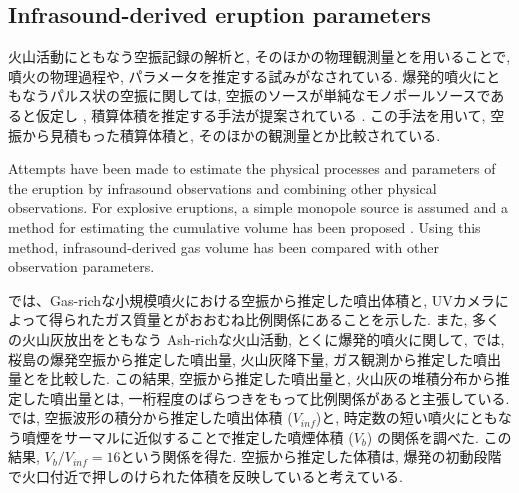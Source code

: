 \documentclass[12pt]{article}
\begin{document}


\clearpage
\subsection{Infrasound-derived eruption parameters}\label{AcointPara}

火山活動にともなう空振記録の解析と, そのほかの物理観測量とを用いることで, 噴火の物理過程や, パラメータを推定する試みがなされている. 
爆発的噴火にともなうパルス状の空振に関しては, 空振のソースが単純なモノポールソースであると仮定し \citep{Lighthill1978}, 積算体積を推定する手法が提案されている \citep{Johnson2003}. この手法を用いて, 空振から見積もった積算体積と, そのほかの観測量とか比較されている.

Attempts have been made to estimate the physical processes and parameters of the eruption by infrasound observations and combining other physical observations.
For explosive eruptions, a simple monopole source is assumed \citep{Lighthill1978} and a method for estimating the cumulative volume has been proposed \citep{Johnson2003}.
Using this method, infrasound-derived gas volume has been compared with other observation parameters.

\cite{Dalton2010}では、Gas-richな小規模噴火における空振から推定した噴出体積と, UVカメラによって得られたガス質量とがおおむね比例関係にあることを示した.
また, 多くの火山灰放出をともなう Ash-richな火山活動, とくに爆発的噴火に関して, \cite{Fee2017a}では, 桜島の爆発空振から推定した噴出量, 火山灰降下量, ガス観測から推定した噴出量とを比較した. この結果, 空振から推定した噴出量と, 火山灰の堆積分布から推定した噴出量とは, 一桁程度のばらつきをもって比例関係があると主張している.
\cite{Yamada2018b}では, 空振波形の積分から推定した噴出体積 ($V_{inf}$)と, 時定数の短い噴火にともなう噴煙をサーマルに近似することで推定した噴煙体積 ($V_{b}$) の関係を調べた. この結果, $V_{b}/V_{inf}=16$という関係を得た. 
空振から推定した体積は, 爆発の初動段階で火口付近で押しのけられた体積を反映していると考えている. 
\end{document}
